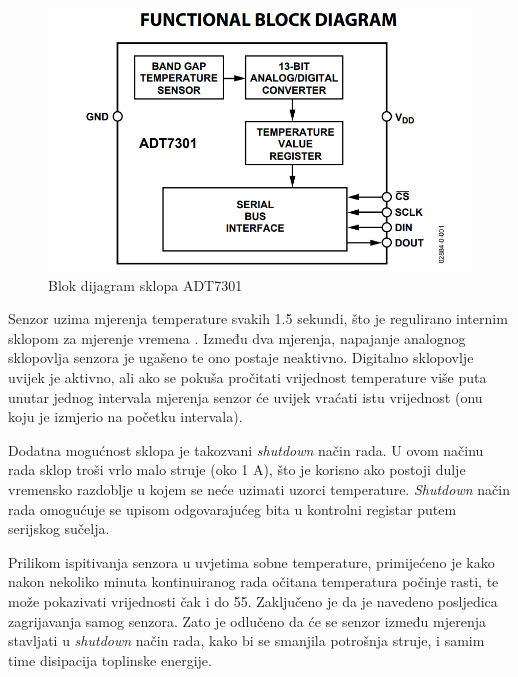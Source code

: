             \begin{figure}[htb]
                \centering
                \includegraphics{slike/ADT7301_blok_dijagram.png}
                \caption{Blok dijagram sklopa ADT7301 \cite{adt7301_datasheet}}
                \label{fig:adt7301_blok_dijagram}
            \end{figure}

            Senzor uzima mjerenja temperature svakih 1.5 sekundi, što je regulirano internim sklopom za mjerenje vremena . Između dva mjerenja, napajanje analognog sklopovlja senzora je ugašeno te ono postaje neaktivno. Digitalno sklopovlje uvijek je aktivno, ali ako se pokuša pročitati vrijednost temperature više puta unutar jednog intervala mjerenja senzor će uvijek vraćati istu vrijednost (onu koju je izmjerio na početku intervala).
            
            Dodatna mogućnost sklopa je takozvani \textit{shutdown} način rada. U ovom načinu rada sklop troši vrlo malo struje (oko 1 \textmu{}A), što je korisno ako postoji dulje vremensko razdoblje u kojem se neće uzimati uzorci temperature. \textit{Shutdown} način rada omogućuje se upisom odgovarajućeg bita u kontrolni registar putem serijskog sučelja.
            
            Prilikom ispitivanja senzora u uvjetima sobne temperature, primijećeno je kako nakon nekoliko minuta kontinuiranog rada očitana temperatura počinje rasti, te može pokazivati vrijednosti čak i do 55\textcelsius{}. Zaključeno je da je navedeno posljedica zagrijavanja samog senzora. Zato je odlučeno da će se senzor između mjerenja stavljati u \textit{shutdown} način rada, kako bi se smanjila potrošnja struje, i samim time disipacija toplinske energije.

